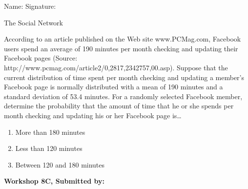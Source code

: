 \documentclass[11pt, chapterprefix=true]{scrbook}\usepackage[]{graphicx}\usepackage[]{color}
\begin{document}
\begin{exercises}
\begin{exercise}
\begin{center}
{{\vspace{4mm}
Name: \underline{\phantom{xxxxxxxxxxxxxxxxxxxxxxxx}} Signature: \underline{\phantom{xxxxxxxxxxxxxxxxxxxxxxxx}}
 }}
\end{center}

The Social Network

According to an article published on the Web site www.PCMag.com, Facebook users spend an average of 190 minutes per month checking and updating their Facebook pages (Source: http://www.pcmag.com/article2/0,2817,2342757,00.asp). Suppose that the current distribution of time spent per month checking and updating a member's Facebook page is normally distributed with a mean of 190 minutes and a standard deviation of 53.4 minutes. For a randomly selected Facebook member, determine the probability that the amount of time that he or she spends per month checking and updating his or her Facebook page is…

\begin{enumerate}
  \item More than 180 minutes
  \item Less than 120 minutes
  \item Between 120 and 180 minutes
\end{enumerate}

\end{exercise} 
\begin{solution}  %

\end{solution}

\clearpage

    \begin{exercise}  %

    \begin{center}
\begin{flushleft}\textbf{\large \hfill Workshop 8C, Submitted by: }\end{flushleft}

\end{center}
\end{exercise}
\end{exercises}
\end{document}
